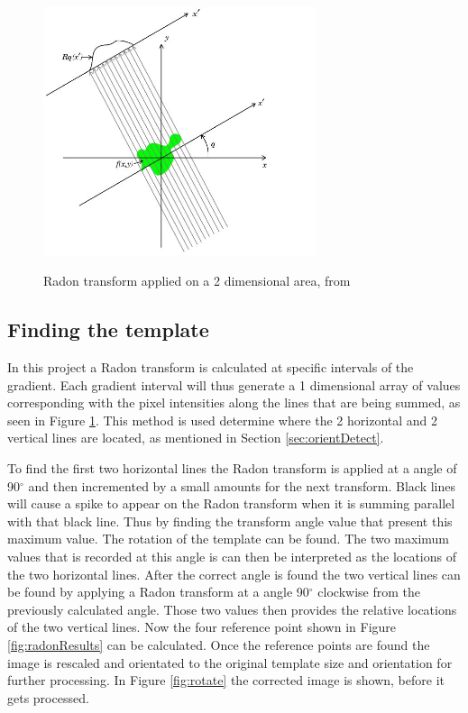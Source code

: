 \begin{figure}
  \centering
  \includegraphics[width=8cm]{RadonT}\\
  \caption{Radon transform applied on a 2 dimensional area, from \citet{radon}}
  \label{fig:RadonT}
\end{figure}

\subsection{Finding the template}
\label{sec:findTemplate}

In this project a Radon transform is calculated at specific intervals of the gradient. Each gradient interval will thus generate a 1 dimensional array of values corresponding with the pixel intensities along the lines that are being summed, as seen in Figure \ref{fig:RadonT}. This method is used determine where the 2 horizontal and 2 vertical lines are located, as mentioned in Section \ref{sec:orientDetect}. 

To find the first two horizontal lines the Radon transform is applied at a angle of 90$^{\circ}$ and then incremented by a small amounts for the next transform. Black lines will cause a spike to appear on the Radon transform when it is summing parallel with that black line. Thus by finding the transform angle value that present this maximum value. The rotation of the template can be found. The two maximum values that is recorded at this angle is can then be interpreted as the locations of the two horizontal lines. After the correct angle is found the two vertical lines can be found by applying a Radon transform at a angle 90$^{\circ}$ clockwise from the previously calculated angle. Those two values then provides the relative locations of the two vertical lines. Now the four reference point shown in Figure \ref{fig:radonResults} can be calculated. Once the reference points are found the image is rescaled and orientated to the original template size and orientation for further processing. In Figure \ref{fig:rotate} the corrected image is shown, before it gets processed.

